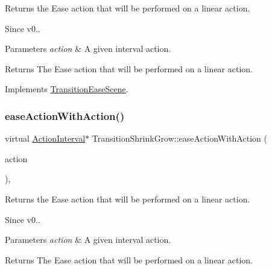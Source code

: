 Returns the Ease action that will be performed on a linear action. \begin{DoxySince}{Since}
v0..
\end{DoxySince}

\begin{DoxyParams}{Parameters}
{\em action} & A given interval action. \\
\hline
\end{DoxyParams}
\begin{DoxyReturn}{Returns}
The Ease action that will be performed on a linear action. 
\end{DoxyReturn}


Implements \hyperlink{classTransitionEaseScene_a6f27540600b0d703ed30adc8976e65df}{Transition\+Ease\+Scene}.

\mbox{\label{classTransitionShrinkGrow_af2d5d53552fcfe2f8d61f89f1663444d}} 
\subsubsection{\texorpdfstring{ease\+Action\+With\+Action()}{easeActionWithAction()}\hspace{0.1cm}{\footnotesize\ttfamily [2/2]}}
{\footnotesize\ttfamily virtual \hyperlink{classActionInterval}{Action\+Interval}$\ast$ Transition\+Shrink\+Grow\+::ease\+Action\+With\+Action (\begin{DoxyParamCaption}\item[{\hyperlink{classActionInterval}{Action\+Interval} $\ast$}]{action }\end{DoxyParamCaption})\hspace{0.3cm}{\ttfamily [override]}, {\ttfamily [virtual]}}

Returns the Ease action that will be performed on a linear action. \begin{DoxySince}{Since}
v0..
\end{DoxySince}

\begin{DoxyParams}{Parameters}
{\em action} & A given interval action. \\
\hline
\end{DoxyParams}
\begin{DoxyReturn}{Returns}
The Ease action that will be performed on a linear action. 
\end{DoxyReturn}



